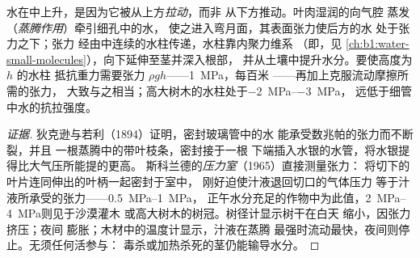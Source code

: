 \begin{theorem}[内聚–张力机制]\label{thm:b1:plant-transport:cohesiontension}
水在中上升，是因为它被从上方\emph{拉动}，而非
从下方推动。叶肉湿润的向气腔
蒸发（\emph{蒸腾作用}）牵引细孔中的水，
使之进入弯月面，其表面张力使后方的水
处于张力之下；张力
经由中连续的水柱传递，水柱靠内聚力维系
（即，见
\cref{ch:b1:water-small-molecules}），向下延伸至茎并深入根部，
并从土壤中提升水分。要使高度为 $h$ 的水柱
抵抗重力需要张力 $\rho g h$——\qty{1}{MPa}，每百米
——再加上克服流动摩擦所需的张力，
大致与之相当；高大树木的水柱处于\qtyrange{-2}{-3}{MPa}，
远低于细管中水的抗拉强度。
\end{theorem}
\begin{proof}[证据]
狄克逊与若利（1894）证明，密封玻璃管中的水
能承受数兆帕的张力而不断裂，并且
一根蒸腾中的带叶枝条，密封接于一根
下端插入水银的水管，将水银提得比大气压所能提的更高。
斯科兰德的\emph{压力室}（1965）直接测量张力：
将切下的叶片连同伸出的叶柄一起密封于室中，
刚好迫使汁液退回切口的气体压力
等于汁液所承受的张力——\qtyrange{0.5}{1}{MPa}，
正午水分充足的作物中为此值，\qtyrange{2}{4}{MPa}则见于沙漠灌木
或高大树木的树冠。树径计显示树干在白天
缩小，因张力挤压；夜间
膨胀；木材中的温度计显示，汁液在蒸腾
最强时流动最快，夜间则停止。无须任何活参与：
毒杀或加热杀死的茎仍能输导水分。
\end{proof}

